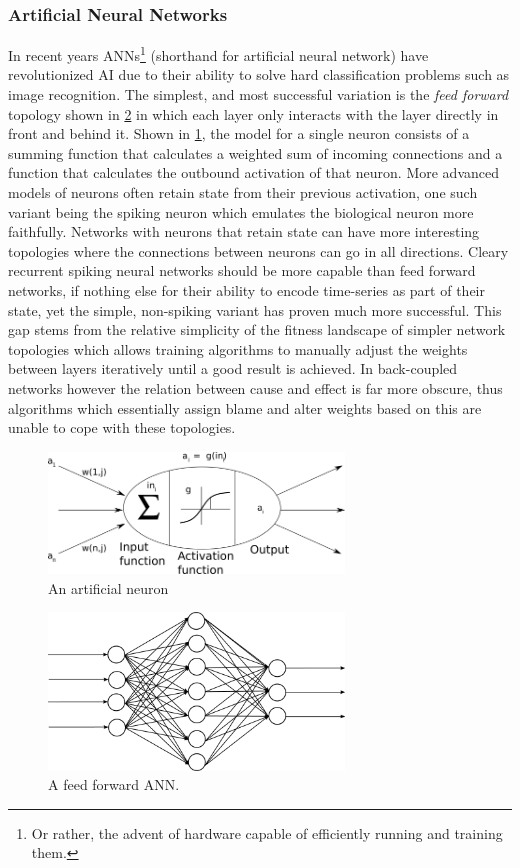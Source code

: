 \subsubsection{Artificial Neural Networks}
In recent years ANNs\footnote{Or rather, the advent of hardware capable of
  efficiently running and training them.} (shorthand for artificial neural
network) have revolutionized AI due to their ability to solve hard
classification problems such as image recognition.
The simplest, and most successful variation is the \emph{feed forward} topology
shown in \ref{figFFANN} in which each layer only interacts with the layer
directly in front and behind it.
Shown in \ref{figNeuronModel}, the model for a single neuron consists of a
summing function that calculates a weighted sum of incoming connections and a
function that calculates the outbound activation of that neuron.
More advanced models of neurons often retain state from their previous
activation, one such variant being the spiking neuron which emulates the
biological neuron more faithfully.
Networks with neurons that retain state can have more interesting topologies
where the connections between neurons can go in all directions.
Cleary recurrent spiking neural networks should be more capable than feed
forward networks, if nothing else for their ability to encode time-series as
part of their state, yet the simple, non-spiking variant has proven much more
successful.
This gap stems from the relative simplicity of the fitness landscape of simpler
network topologies which allows training algorithms to manually adjust the
weights between layers iteratively until a good result is achieved.
In back-coupled networks however the relation between cause and effect is far
more obscure, thus algorithms which essentially assign blame and alter weights
based on this are unable to cope with these topologies.
\begin{figure}[h!]
  \centering
  \includegraphics[width=0.7\textwidth]{fig/ArtificialNeuron.png}
  \caption{An artificial neuron}
  \label{figNeuronModel}
\end{figure}
\begin{figure}[h!]
  \centering
  \includegraphics[width=0.7\textwidth]{fig/feedforward.png}
  \caption{A feed forward ANN.}
  \label{figFFANN}
\end{figure}
